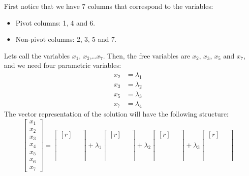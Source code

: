 \documentclass[12pt]{article}
\begin{document}
\begin{enumerate}
First notice that we have 7 columns that correspond to the variables:
\begin{itemize}
\item Pivot columns: 1, 4 and 6.
\item Non-pivot columns: 2, 3, 5 and 7.
\end{itemize}
Lets call the variables $x_1$, $x_2$,\dots $x_7$. Then, the free variables are $x_2$, $x_3$, $x_5$ and $x_7$, and we need four parametric variables:
\begin{align*}
x_2 &= \lambda_1\\
x_3 &= \lambda_2\\
x_5 &= \lambda_3\\
x_7 &=\lambda_4
\end{align*}
The vector representation of the solution will have the following structure:
\[
\begin{bmatrix}x_1\\x_2\\x_3\\x_4\\x_5\\x_6\\x_7\end{bmatrix}
=
\begin{bmatrix*}[r]           \quad \\ \\ \\ \\ \\ \\ \\ \end{bmatrix*}
+\lambda_1\begin{bmatrix*}[r] \quad \\ \\ \\ \\ \\ \\ \\ \end{bmatrix*}
+\lambda_2\begin{bmatrix*}[r] \quad \\ \\ \\ \\ \\ \\ \\ \end{bmatrix*}
+\lambda_3\begin{bmatrix*}[r] \quad \\ \\ \\ \\ \\ \\ \\ \end{bmatrix*}
\]
\end{enumerate}
\end{document}
